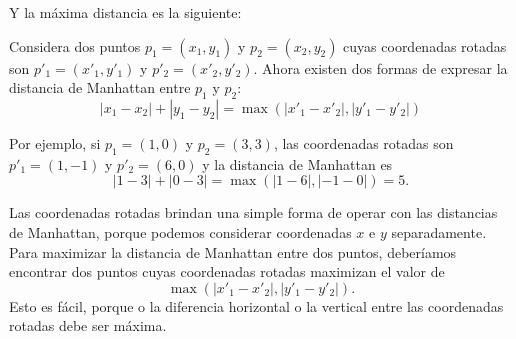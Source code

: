 \begin{center}
\end{center}
Y la máxima distancia es la siguiente:
\begin{center}
\end{center}

Considera dos puntos $p_1=(x_1,y_1)$ y $p_2=(x_2,y_2)$ cuyas coordenadas
rotadas son $p'_1=(x'_1,y'_1)$ y $p'_2=(x'_2,y'_2)$. Ahora existen dos
formas de expresar la distancia de Manhattan entre $p_1$ y $p_2$:
\[|x_1-x_2|+|y_1-y_2| = \max(|x'_1-x'_2|,|y'_1-y'_2|)\]

Por ejemplo, si $p_1=(1,0)$ y $p_2=(3,3)$, las coordenadas rotadas son
$p'_1=(1,-1)$ y $p'_2=(6,0)$ y la distancia de Manhattan es
\[|1-3|+|0-3| = \max(|1-6|,|-1-0|) = 5.\]

Las coordenadas rotadas brindan una simple forma de operar con las distancias
de Manhattan, porque podemos considerar coordenadas $x$ e $y$ separadamente.
Para maximizar la distancia de Manhattan entre dos puntos, deberíamos
encontrar dos puntos cuyas coordenadas rotadas maximizan el valor de
\[\max(|x'_1-x'_2|,|y'_1-y'_2|).\]
Esto es fácil, porque o la diferencia horizontal o la vertical entre las
coordenadas rotadas debe ser máxima.
